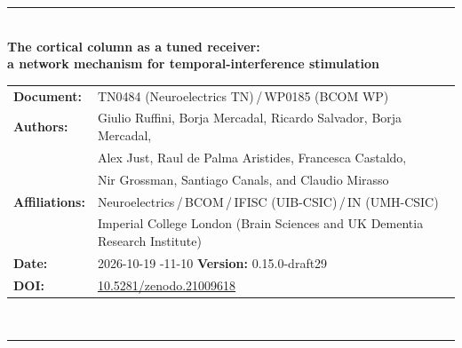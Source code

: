 \documentclass[11pt,a4paper]{article}
\newif\ifsupp
\newcommand{\paperver}{0.15.0-draft29} %
\providecommand{\DIFaddtex}[1]{{\protect\color{blue} \sf #1}} %
\providecommand{\DIFdeltex}[1]{{\protect\color{red} \scriptsize #1}} %
\providecommand{\DIFaddbegin}{} %
\providecommand{\DIFaddend}{} %
\providecommand{\DIFdelbegin}{} %
\providecommand{\DIFdelend}{} %
\providecommand{\DIFadd}[1]{\texorpdfstring{\DIFaddtex{#1}}{#1}} %
\providecommand{\DIFdel}[1]{\texorpdfstring{\DIFdeltex{#1}}{}} %
\begin{document}
\vspace{6pt}
\else
\begin{flushleft}
{\color{neblue}\rule{\textwidth}{2pt}}\\[4pt]
{\LARGE\bfseries The cortical column as a tuned receiver:\\[2pt]
a network mechanism for temporal-interference stimulation}\\[10pt]
\begin{tabular}{@{}ll@{}}
\textbf{Document:} & TN0484 (Neuroelectrics TN)\,/\,WP0185 (BCOM WP) \\
\textbf{Authors:} & Giulio Ruffini, \DIFdelbegin \DIFdel{Borja Mercadal, }\DIFdelend Ricardo Salvador, \DIFaddbegin \DIFadd{Borja Mercadal,}\DIFaddend \\
& \DIFdelbegin \DIFdel{Alex Just, }\DIFdelend Raul de Palma Aristides, Francesca Castaldo,\\
& Nir Grossman, Santiago Canals, and Claudio Mirasso \\
\textbf{Affiliations:} & Neuroelectrics\,/\,BCOM\,/\,IFISC (UIB-CSIC)\,/\,IN (UMH-CSIC)\\
& Imperial College London (Brain Sciences and UK Dementia Research Institute) \\
\textbf{Date:} & \DIFdelbegin \DIFdel{2026-10-19 }\DIFdelend \DIFaddbegin \DIFadd{2026-11-10 }\DIFaddend \qquad \textbf{Version:} \paperver \\
\textbf{DOI:} & \href{https://doi.org/10.5281/zenodo.21009618}{10.5281/zenodo.21009618} \\
\end{tabular}\\[4pt]
{\color{neblue}\rule{\textwidth}{1pt}}
\end{flushleft}
\fi

\ifsupp
\begin{center}
{\large\bfseries Supplementary Material}\\[4pt]
\begin{minipage}{0.86\textwidth}\centering\small
\DIFdelbegin \DIFdel{Appendices and supplementary }\DIFdelend \DIFaddbegin \DIFadd{Additional methods, derivations, and }\DIFaddend figures accompanying the article. \DIFdelbegin \DIFdel{Section, equation and figure numbersreferenced here follow the main text;
supplementary figures are numbered
S1, S2, }%
\DIFdelend \DIFaddbegin \DIFadd{Sections, equations, and figures use S-prefixed numbers;
references to article equations are marked as main-text references.
}\DIFaddend \end{minipage}
\end{center}
\vspace{8pt}
\fi
\end{document}
